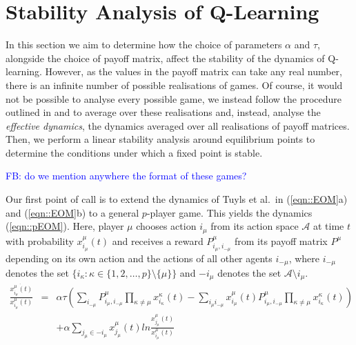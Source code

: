 \documentclass[sigconf,anonymous]{aamas}
\newcommand{\xmu}[2]{x_{#1_#2}^{#2}(t)}
\newcommand{\payoff}[2]{P^{#2}_{#1_#2, #1_{-#2}}}
\newcommand\fb[1]{\textcolor{blue}{FB: #1}}
\begin{document}
\section{Stability Analysis of Q-Learning} \label{sec::Theory}

In this section we aim to determine how the choice of parameters
$\alpha$ and $\tau$, alongside the choice of payoff matrix, affect the
stability of the dynamics of Q-learning. However, as the values in the
payoff matrix can take any real number, there is an infinite number
of possible realisations of games. Of course, it would not be possible
to analyse every possible game, we instead follow the procedure
outlined in \cite{Coolen2005} and \cite{Galla2013} to average over
these realisations and, instead, analyse the \textit{effective
  dynamics}, the dynamics averaged over all realisations of payoff
matrices. Then, we perform a linear stability analysis around
equilibrium points to determine the conditions under which a fixed
point is stable.

\fb{do we mention anywhere the format of these games?}

Our first point of call is to extend the dynamics of Tuyls et al.~in
(\ref{eqn::EOM}a) and (\ref{eqn::EOM}b) to a general $p$-player
game. This yields the dynamics (\ref{eqn::pEOM}). Here, player $\mu$
chooses action $i_{\mu}$ from its action space $\mathcal{A}$ at time
$t$ with probability $\xmu{i}{\mu}$ and receives a reward
$\payoff{i}{\mu}$ from its payoff matrix $P^\mu$ depending on its own
action and the actions of all other agents $i_{-\mu}$, where $i_{-\mu}$ denotes the set $\{ i_\kappa : \kappa \in \{1, 2,
\ldots , p\} \setminus \{\mu\} \}$ and $-i_{\mu}$ denotes the set
$\mathcal{A} \setminus {i_\mu}$.
%
\begin{eqnarray}
    \frac{\dot{\xmu{i}{\mu}}}{\xmu{i}{\mu}} \! \! \! \! \! \! & = \! \! \! \! \! \! & \alpha \tau \left( \sum_{i_{-\mu}} \payoff{i}{\mu} \prod_{\kappa \neq \mu} \xmu{i}{\kappa} -  \sum_{i_\mu i_{-\mu}} \xmu{i}{\mu} \payoff{i}{\mu} \prod_{\kappa \neq \mu} \xmu{i}{\kappa} \right) \nonumber \\
    & & + \alpha \sum_{j_\mu \in -i_\mu} \xmu{j}{\mu} ln \frac{\xmu{j}{\mu}}{\xmu{i}{\mu}}     \label{eqn::pEOM}
\end{eqnarray}
\end{document}
